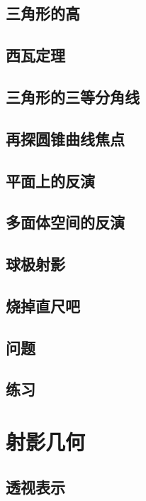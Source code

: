 \documentclass[cn,fancy,blue,11pt]{elegantbook}
\begin{document}
\section{三角形的高}

\section{西瓦定理}

\section{三角形的三等分角线}

\section{再探圆锥曲线焦点}

\section{平面上的反演}

\section{多面体空间的反演}

\section{球极射影}

\section{烧掉直尺吧}

\section{问题}

\section{练习}

\chapter{射影几何}

\section{透视表示}
\end{document}
